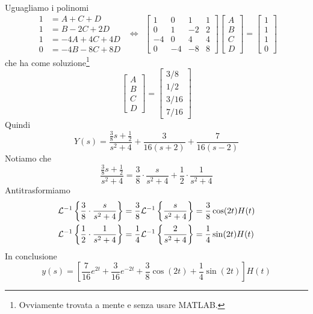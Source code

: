 Uguagliamo i polinomi
\begin{equation*}
\begin{aligned}
1 & = A + C + D\\
1 & = B - 2C + 2D\\
1 & = - 4A + 4C + 4D\\
0 & = - 4B - 8C + 8D
\end{aligned} \ \ \iff \ \ 
\begin{bmatrix}
1 & 0 & 1 & 1\\
0 & 1 & - 2 & 2\\
- 4 & 0 & 4 & 4\\
0 & - 4 & - 8 & 8
\end{bmatrix}
\begin{bmatrix}
A\\
B\\
C\\
D
\end{bmatrix} = 
\begin{bmatrix}
1\\
1\\
1\\
0
\end{bmatrix}
\end{equation*}
che ha come soluzione\footnote{Ovviamente trovata a mente e senza usare MATLAB.}
\begin{equation*}
\begin{bmatrix}
A\\
B\\
C\\
D
\end{bmatrix} = 
\begin{bmatrix}
3/8\\
1/2\\
3/16\\
7/16
\end{bmatrix}
\end{equation*}
Quindi
\begin{equation*}
Y(s) = \frac{\frac{3}{8} s + \frac{1}{2}}{s^{2} + 4} + \frac{3}{16(s + 2)} + \frac{7}{16(s - 2)}
\end{equation*}
Notiamo che
\begin{equation*}
\frac{\frac{3}{8} s + \frac{1}{2}}{s^{2} + 4} = \frac{3}{8} \cdot \frac{s}{s^{2} + 4} + \frac{1}{2} \cdot \frac{1}{s^{2} + 4}
\end{equation*}
Antitrasformiamo
\begin{align*}
\mathcal{L}^{- 1}\left\{\frac{3}{8} \cdot \frac{s}{s^{2} + 4}\right\} & = \frac{3}{8}\mathcal{L}^{- 1}\left\{\frac{s}{s^{2} + 4}\right\} = \frac{3}{8}\cos(2t) H(t)\\
\mathcal{L}^{- 1}\left\{\frac{1}{2} \cdot \frac{1}{s^{2} + 4}\right\} & = \frac{1}{4}\mathcal{L}^{- 1}\left\{\frac{2}{s^{2} + 4}\right\} = \frac{1}{4}\sin(2t) H(t)
\end{align*}
In conclusione
\begin{equation*}
y(s) = \left[\frac{7}{16} e^{2t} + \frac{3}{16} e^{- 2t} + \frac{3}{8}\cos(2t) + \frac{1}{4}\sin(2t)\right] H(t)
\end{equation*}

